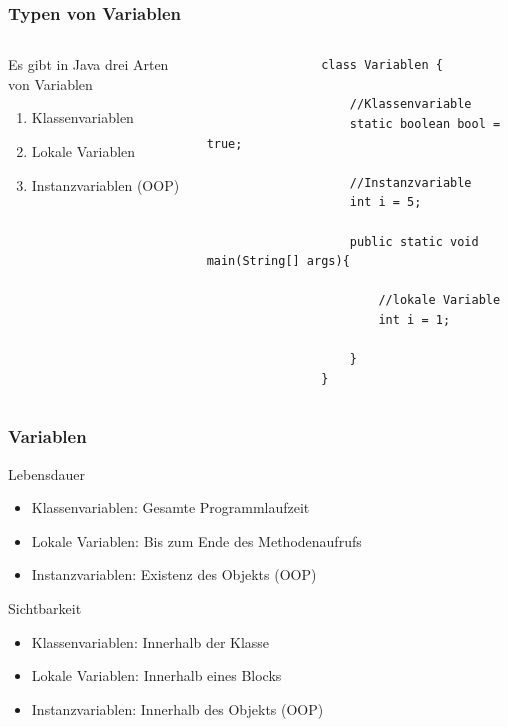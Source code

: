 \begin{frame}[fragile]
	\frametitle{Typen von Variablen}
	\begin{columns}
		\begin{column}{0.5\textwidth}
			\small
				Es gibt in Java drei Arten von Variablen
					\begin{enumerate}
					  \item Klassenvariablen
					  \item Lokale Variablen
					  \item Instanzvariablen (OOP)
					\end{enumerate}
		\end{column}
		\begin{column}{0.5\textwidth}
			\begin{lstlisting}
				class Variablen {
					
					//Klassenvariable
					static boolean bool = true; 
					
					//Instanzvariable
					int i = 5; 
					
					public static void main(String[] args){ 
						
						//lokale Variable
						int i = 1;
						
					}
				}
			\end{lstlisting}
		\end{column}
	\end{columns}
\end{frame}
 
\begin{frame}
	\frametitle{Variablen}
	\begin{block}{Lebensdauer}
		\begin{itemize}
			 \item Klassenvariablen: Gesamte Programmlaufzeit
			 \item Lokale Variablen: Bis zum Ende des Methodenaufrufs
			 \item Instanzvariablen: Existenz des Objekts (OOP)
		\end{itemize}
	\end{block}
	\begin{exampleblock}{Sichtbarkeit}
		\begin{itemize}
			 \item Klassenvariablen: Innerhalb der Klasse
			 \item Lokale Variablen: Innerhalb eines Blocks
			 \item Instanzvariablen: Innerhalb des Objekts (OOP)
		\end{itemize}
	\end{exampleblock}
\end{frame} 


